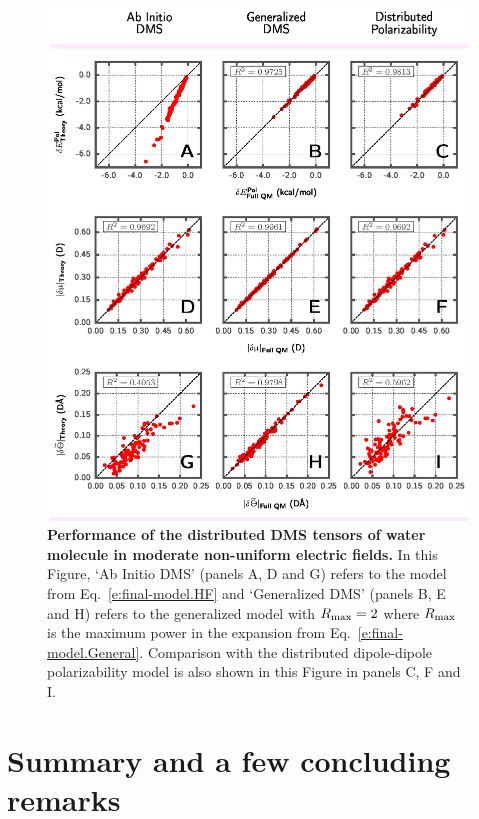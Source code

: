 \documentclass[aip,amsmath,amssymb,reprint,floatfix]{revtex4-1}
\begin{document}
\begin{figure}[h]
\includegraphics[width=\textwidth]{data/dmatpol/water/figure1/fig-2.eps}
\caption{\label{f:fig-2} {\bf Performance of the distributed DMS tensors of water molecule in moderate
non\hyp{}uniform electric fields.}
In this Figure, `Ab Initio DMS' (panels A, D and G) 
refers to the model from Eq.~\eqref{e:final-model.HF} and
`Generalized DMS' (panels B, E and H) 
refers to the generalized model with $R_{\rm max}=2$ 
where $R_{\rm max}$ is the maximum power
in the expansion from Eq.~\eqref{e:final-model.General}.
Comparison with the distributed dipole\hyp{}dipole polarizability model 
is also shown in this Figure in panels C, F and I.}
\end{figure}

\section{\label{s:5}Summary and a few concluding remarks}
\end{document}
